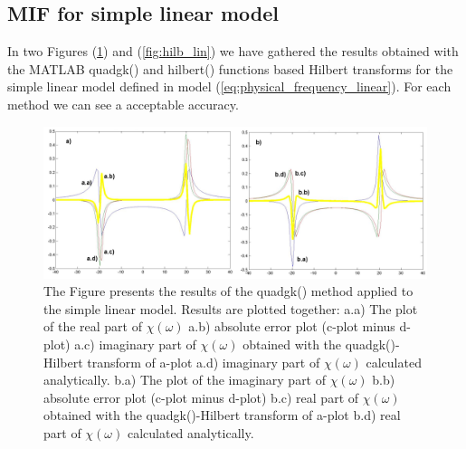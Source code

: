 \documentclass[12pt,twoside,a4paper]{article}
\numberwithin{equation}{subsection}
\numberwithin{figure}{subsection}
\begin{document}
\subsection{MIF for simple linear model} \label{chap:matlab_lin}

In two Figures (\ref{fig:quadgk_lin}) and (\ref{fig:hilb_lin}) we have ga\-thered the results ob\-tained with the MATLAB quadgk() and
hilbert() functions based Hil\-bert trans\-forms for the simple linear model defined in model (\ref{eq:physical_frequency_linear}).
For each method we can see a accep\-table accu\-racy.

\begin{figure} 
  \includegraphics[width=150mm]{img/quadgk_lin.png}
  \caption{The Figure presents the results of the quadgk() method applied to the simple linear model. Results are plotted together:
   a.a) The plot of the real part of $\chi (\omega )$ 
   a.b) absolute error plot (c-plot minus d-plot) 
   a.c) imaginary part of $\chi (\omega )$ obtained with the quadgk()-Hilbert transform of a-plot 
   a.d) imaginary part of $\chi (\omega )$  calculated analytically. 
   b.a) The plot of the imaginary part of $\chi (\omega )$ 
   b.b) absolute error plot (c-plot minus d-plot) 
   b.c) real part of $\chi (\omega )$ obtained with the quadgk()-Hilbert transform of a-plot 
   b.d) real part of $\chi (\omega )$ calculated analytically. \label{fig:quadgk_lin}
  }
\end{figure}
\end{document}
